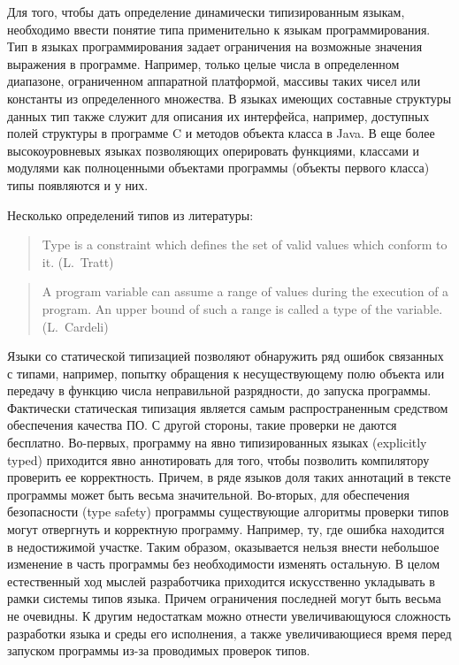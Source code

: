 \intro

Для того, чтобы дать определение динамически типизированным языкам, необходимо
ввести понятие типа применительно к языкам программирования. Тип в языках
программирования задает ограничения на возможные значения выражения в программе.
Например, только целые числа в определенном диапазоне, ограниченном аппаратной
платформой, массивы таких чисел или константы из определенного множества. В
языках имеющих составные структуры данных тип также служит для описания их
интерфейса, например, доступных полей структуры в программе C и методов объекта
класса в Java. В еще более высокоуровневых языках позволяющих оперировать
функциями, классами и модулями как полноценными объектами программы (объекты
первого класса) типы появляются и у них. 

Несколько определений типов из литературы:

\begin{quote} 
Type is a constraint which defines the set of valid values which
conform to it. (L.~Tratt) 
\end{quote} 

\begin{quote}
A program variable can assume a range of values during the execution of a
program. An upper bound of such a range is called a type of the variable. 
(L.~Cardeli)
\end{quote}


Языки со статической типизацией позволяют обнаружить ряд ошибок связанных с
типами, например, попытку обращения к несуществующему полю объекта или
передачу в функцию числа неправильной разрядности, до запуска программы.
Фактически статическая типизация является самым распространенным средством
обеспечения качества ПО. С другой стороны, такие проверки не даются бесплатно.
Во-первых, программу на явно типизированных языках (explicitly typed)
приходится явно аннотировать для того, чтобы позволить компилятору проверить
ее корректность. Причем, в ряде языков доля таких аннотаций в тексте программы
может быть весьма значительной. Во-вторых, для обеспечения безопасности (type
safety) программы существующие алгоритмы проверки типов могут отвергнуть и
корректную программу. Например, ту, где ошибка находится в недостижимой участке.
Таким образом, оказывается нельзя внести небольшое изменение в часть программы
без необходимости изменять остальную. В целом естественный ход мыслей
разработчика приходится искусственно укладывать в рамки системы типов языка.
Причем ограничения последней могут быть весьма не очевидны. К другим недостаткам
можно отнести увеличивающуюся сложность разработки языка и среды его
исполнения, а также увеличивающиеся время перед запуском программы из-за
проводимых проверок типов.

